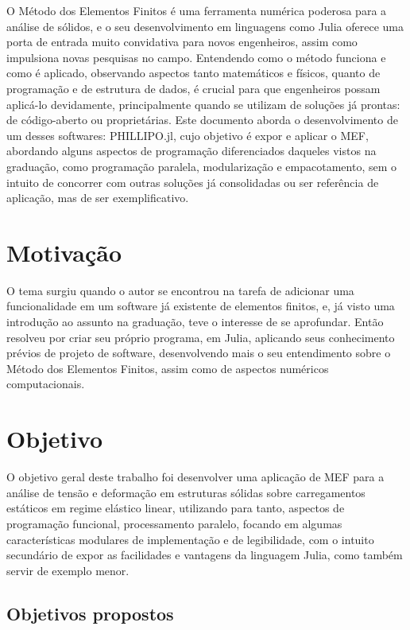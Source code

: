O Método dos Elementos Finitos é uma ferramenta numérica poderosa para a análise de sólidos, e o seu desenvolvimento em linguagens como Julia oferece uma porta de entrada muito convidativa para novos engenheiros, assim como impulsiona novas pesquisas no campo. Entendendo como o método funciona e como é aplicado, observando aspectos tanto matemáticos e físicos, quanto de programação e de estrutura de dados, é crucial para que engenheiros possam aplicá-lo devidamente, principalmente quando se utilizam de soluções já prontas: de código-aberto ou proprietárias. Este documento aborda o desenvolvimento de um desses softwares: PHILLIPO.jl, cujo objetivo é expor e aplicar o MEF, abordando alguns aspectos de programação diferenciados daqueles vistos na graduação, como programação paralela, modularização e empacotamento, sem o intuito de concorrer com outras soluções já consolidadas ou ser referência de aplicação, mas de ser exemplificativo.

\section{Motivação}

O tema surgiu quando o autor se encontrou na tarefa de adicionar uma funcionalidade em um software já existente de elementos finitos, e, já visto uma introdução ao assunto na graduação, teve o interesse de se aprofundar. Então resolveu por criar seu próprio programa, em Julia, aplicando seus conhecimento prévios de projeto de software, desenvolvendo mais o seu entendimento sobre o Método dos Elementos Finitos, assim como de aspectos numéricos computacionais.


\section{Objetivo}

O objetivo geral deste trabalho foi desenvolver uma aplicação de MEF para a análise de tensão e deformação em estruturas sólidas sobre carregamentos estáticos em regime elástico linear, utilizando para tanto, aspectos de programação funcional, processamento paralelo, focando em algumas características modulares de implementação e de legibilidade, com o intuito secundário de expor as facilidades e vantagens da linguagem Julia, como também servir de exemplo menor.

\subsection{Objetivos propostos}


